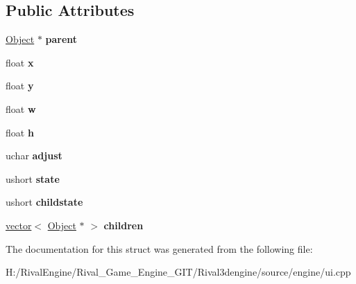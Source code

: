 \subsection*{Public Attributes}
\begin{DoxyCompactItemize}
\item 
\mbox{\label{struct_u_i_1_1_object_ac32a6e79b632fc7d23a01f0d90d5647a}} 
\hyperlink{struct_u_i_1_1_object}{Object} $\ast$ {\bfseries parent}
\item 
\mbox{\label{struct_u_i_1_1_object_abcc87ea735831beb4f4f1a8f2b0ee3e6}} 
float {\bfseries x}
\item 
\mbox{\label{struct_u_i_1_1_object_a4142551c0cbd5c56628efd0bc982c44c}} 
float {\bfseries y}
\item 
\mbox{\label{struct_u_i_1_1_object_a381047fb4f38d8ed100f75a1956911f2}} 
float {\bfseries w}
\item 
\mbox{\label{struct_u_i_1_1_object_a8afb3621c4bfe92cbb4ae8e816930720}} 
float {\bfseries h}
\item 
\mbox{\label{struct_u_i_1_1_object_a460787b638049cc6f980c91ae6ae9824}} 
uchar {\bfseries adjust}
\item 
\mbox{\label{struct_u_i_1_1_object_ab75ecea20f0c6b6445b830bac1f8c69f}} 
ushort {\bfseries state}
\item 
\mbox{\label{struct_u_i_1_1_object_af7bbb9091af50330d1cd69b2711844a1}} 
ushort {\bfseries childstate}
\item 
\mbox{\label{struct_u_i_1_1_object_ae3f6355ca157af5fa11776a3eb75bad6}} 
\hyperlink{structvector}{vector}$<$ \hyperlink{struct_u_i_1_1_object}{Object} $\ast$ $>$ {\bfseries children}
\end{DoxyCompactItemize}


The documentation for this struct was generated from the following file\+:\begin{DoxyCompactItemize}
\item 
H\+:/\+Rival\+Engine/\+Rival\+\_\+\+Game\+\_\+\+Engine\+\_\+\+G\+I\+T/\+Rival3dengine/source/engine/ui.\+cpp\end{DoxyCompactItemize}
